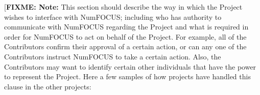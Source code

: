 
[\textbf{FIXME: Note:} This section should describe the way in which the
  Project wishes to interface with NumFOCUS; including who has authority to
  communicate with NumFOCUS regarding the Project and what is required in order
  for NumFOCUS to act on behalf of the Project. For example, all of the
  Contributors confirm their approval of a certain action, or can any one of
  the Contributors instruct NumFOCUS to take a certain action. Also, the
  Contributors may want to identify certain other individuals that have the
  power to represent the Project. Here a few samples of how projects have
  handled this clause in the other projects:


